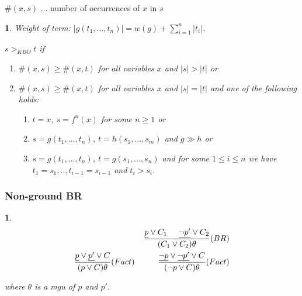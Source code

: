 \documentclass[]{article}
\newtheorem*{green}{}
\newtheorem*{blue}{}
\begin{document}
\begin{multicols}{3}
\begin{minipage}[t]{.31\textwidth}
$\#(x,s)$ ... number of occurrences of $x$ in $s$

\begin{green}
Weight of term: $|g(t_1,...,t_n)| = w(g) + \sum_{i=1}^{n}|t_i|$.

$s >_{KBO} t$ if
\begin{enumerate}
	\item $\#(x,s) \geq \#(x,t)$ for all variables $x$ and $|s|>|t|$ or
	\item $\#(x,s) \geq \#(x,t)$ for all variables $x$ and $|s|=|t|$ and one of the following holds:
	\begin{enumerate}
		\item $t=x$, $s=f^n(x)$ for some $n\geq 1$ or
		\item $s=g(t_1,...,t_n)$, $t=h(s_1,...,s_m)$ and $g \gg h$ or
		\item $s=g(t_1,...,t_n)$, $t=g(s_1,...,s_n)$ and for some $1\leq i \leq n$ we have $t_1=s_1,.., t_{i-1}=s_{i-1}$ and $t_i > s_i$.
	\end{enumerate}
\end{enumerate}
\end{green}

\subsubsection*{Non-ground BR}
\begin{blue}
\begin{align*}
	\frac{\underline{p}\lor C_1 \hspace{.5cm} \underline{\lnot p'} \lor C_2}{(C_1 \lor C_2)\theta} (BR)\\
	\frac{\underline{p}\lor \underline{p'} \lor C}{(p \lor C)\theta} (Fact) \hspace{1cm} \frac{\underline{\lnot p}\lor \underline{\lnot p'} \lor C}{(\lnot p \lor C)\theta} (Fact)
\end{align*}

where $\theta$ is a mgu of $p$ and $p'$.
\end{blue}


\end{minipage}
\end{multicols}
\end{document}
